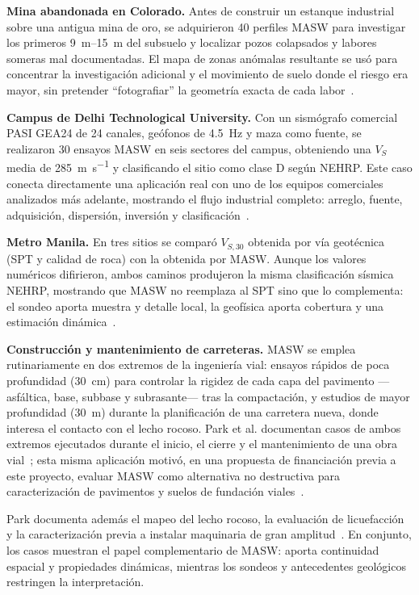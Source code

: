 \textbf{Mina abandonada en Colorado.} Antes de construir un estanque industrial sobre
una antigua mina de oro, se adquirieron 40 perfiles MASW para investigar los primeros
\SIrange{9}{15}{\meter} del subsuelo y localizar pozos colapsados y labores someras mal
documentadas. El mapa de zonas anómalas resultante se usó para concentrar la
investigación adicional y el movimiento de suelo donde el riesgo era mayor, sin pretender
``fotografiar'' la geometría exacta de cada labor~\cite{Crook2017}.

\textbf{Campus de Delhi Technological University.} Con un sismógrafo comercial PASI
GEA24 de 24 canales, geófonos de \SI{4.5}{\hertz} y maza como fuente, se realizaron 30
ensayos MASW en seis sectores del campus, obteniendo una $V_S$ media de
\SI{285}{\meter\per\second} y clasificando el sitio como clase D según NEHRP. Este caso
conecta directamente una aplicación real con uno de los equipos comerciales analizados
más adelante, mostrando el flujo industrial completo: arreglo, fuente, adquisición,
dispersión, inversión y clasificación~\cite{Gautam2020}.

\textbf{Metro Manila.} En tres sitios se comparó $V_{S,30}$ obtenida por vía geotécnica
(SPT y calidad de roca) con la obtenida por MASW. Aunque los valores numéricos difirieron,
ambos caminos produjeron la misma clasificación sísmica NEHRP, mostrando que MASW no
reemplaza al SPT sino que lo complementa: el sondeo aporta muestra y detalle local, la
geofísica aporta cobertura y una estimación dinámica~\cite{Monjardin2023}.

\textbf{Construcción y mantenimiento de carreteras.} MASW se emplea rutinariamente en
dos extremos de la ingeniería vial: ensayos rápidos de poca profundidad
(\SI{30}{\centi\meter}) para controlar la rigidez de cada capa del pavimento
---asfáltica, base, subbase y subrasante--- tras la compactación, y estudios de mayor
profundidad (\SI{30}{\meter}) durante la planificación de una carretera nueva, donde
interesa el contacto con el lecho rocoso. Park et al. documentan casos de ambos extremos
ejecutados durante el inicio, el cierre y el mantenimiento de una obra
vial~\cite{Park2018Roads}; esta misma aplicación motivó, en una propuesta de
financiación previa a este proyecto, evaluar MASW como alternativa no destructiva para
caracterización de pavimentos y suelos de fundación viales~\cite{PINV01317}.

Park documenta además el mapeo del lecho rocoso, la evaluación de licuefacción y la
caracterización previa a instalar maquinaria de gran amplitud~\cite{Park2013}. En
conjunto, los casos muestran el papel complementario de MASW: aporta continuidad
espacial y propiedades dinámicas, mientras los sondeos y antecedentes geológicos
restringen la interpretación.

